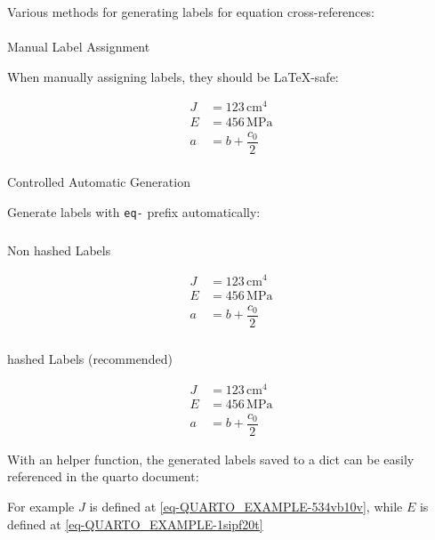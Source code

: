 \documentclass[
  letterpaper,
  DIV=11,
  numbers=noendperiod,
  fleqn]{scrartcl}
\makeatletter
\let\oldparagraph\paragraph
\renewcommand{\paragraph}{
    \@ifstar
      \xxxParagraphStar
      \xxxParagraphNoStar
  }
\newcommand{\xxxParagraphStar}[1]{\oldparagraph*{#1}\mbox{}}
\newcommand{\xxxParagraphNoStar}[1]{\oldparagraph{#1}\mbox{}}
\let\oldsubparagraph\subparagraph
\renewcommand{\subparagraph}{
    \@ifstar
      \xxxSubParagraphStar
      \xxxSubParagraphNoStar
  }
\newcommand{\xxxSubParagraphStar}[1]{\oldsubparagraph*{#1}\mbox{}}
\newcommand{\xxxSubParagraphNoStar}[1]{\oldsubparagraph{#1}\mbox{}}
\makeatother
\begin{document}
Various methods for generating labels for equation cross-references:

\paragraph{Manual Label Assignment}\label{manual-label-assignment}

When manually assigning labels, they should be LaTeX-safe:

\begin{align}
J & = 123{\,}\text{cm}^{4}  \label{eq-moment-of-inertia}  \\[8pt]
 E & = 456{\,}\text{MPa}  \label{eq-modulus-of-elasticity}  \\[8pt]
 a & = b + \dfrac{c_{0}}{2}  \label{eq-an-expression} 
\end{align}

\paragraph{Controlled Automatic
Generation}\label{controlled-automatic-generation}

Generate labels with \texttt{eq-} prefix automatically:

\subparagraph{Non hashed Labels}\label{non-hashed-labels}

\begin{align}
J & = 123{\,}\text{cm}^{4}  \label{eq-QUARTO_EXAMPLE-moment-of-inertia}  \\[8pt]
 E & = 456{\,}\text{MPa}  \label{eq-QUARTO_EXAMPLE-modulus-of-elasticity}  \\[8pt]
 a & = b + \dfrac{c_{0}}{2}  \label{eq-QUARTO_EXAMPLE-an-expression} 
\end{align}

\subparagraph{hashed Labels
(recommended)}\label{hashed-labels-recommended}

\begin{align}
J & = 123{\,}\text{cm}^{4}  \label{eq-QUARTO_EXAMPLE-534vb10v}  \\[8pt]
 E & = 456{\,}\text{MPa}  \label{eq-QUARTO_EXAMPLE-1sipf20t}  \\[8pt]
 a & = b + \dfrac{c_{0}}{2}  \label{eq-QUARTO_EXAMPLE-30phqdq8} 
\end{align}

With an helper function, the generated labels saved to a dict can be
easily referenced in the quarto document:

For example \(J\) is defined at \eqref{eq-QUARTO_EXAMPLE-534vb10v},
while \(E\) is defined at \eqref{eq-QUARTO_EXAMPLE-1sipf20t}
\end{document}
